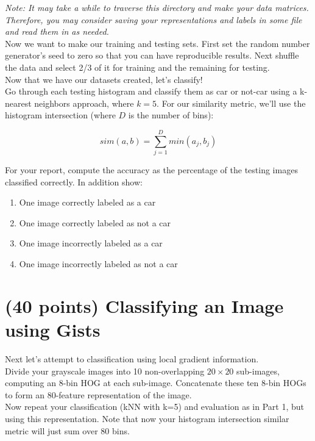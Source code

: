 \documentclass[12pt]{article}
\begin{document}
\noindent
\emph{Note:  It may take a while to traverse this directory and make your data matrices.  Therefore, you may consider saving your representations and labels in some file and read them in as needed.}\\

\noindent
Now we want to make our training and testing sets.  First set the random number generator’s seed to zero so that you can have reproducible results.  Next shuffle the data and select 2/3 of it for training and the remaining for testing.\\

\noindent
Now that we have our datasets created, let’s classify!\\

\noindent
Go through each testing histogram and classify them as car or not-car using a k-nearest neighbors approach, where $k=5$.  For our similarity metric, we’ll use the histogram intersection (where $D$ is the number of bins):

$$sim(a,b)=\sum_{j=1}^{D} min(a_j,b_j )$$

\noindent
For your report, compute the accuracy as the percentage of the testing images classified correctly.  In addition show:

\begin{enumerate}
\item One image correctly labeled as a car
\item One image correctly labeled as not a car
\item One image incorrectly labeled as a car
\item One image incorrectly labeled as not a car
\end{enumerate}

\newpage

\section{(40 points) Classifying an Image using Gists}
Next let’s attempt to classification using local gradient information.\\

\noindent
Divide your grayscale images into 10 non-overlapping $20\times 20$ sub-images, computing an 8-bin HOG at each sub-image.  Concatenate these ten 8-bin HOGs to form an 80-feature representation of the image.\\

\noindent
Now repeat your classification (kNN with k=5) and evaluation as in Part 1, but using this representation.  Note that now your histogram intersection similar metric will just sum over 80 bins.
\end{document}
